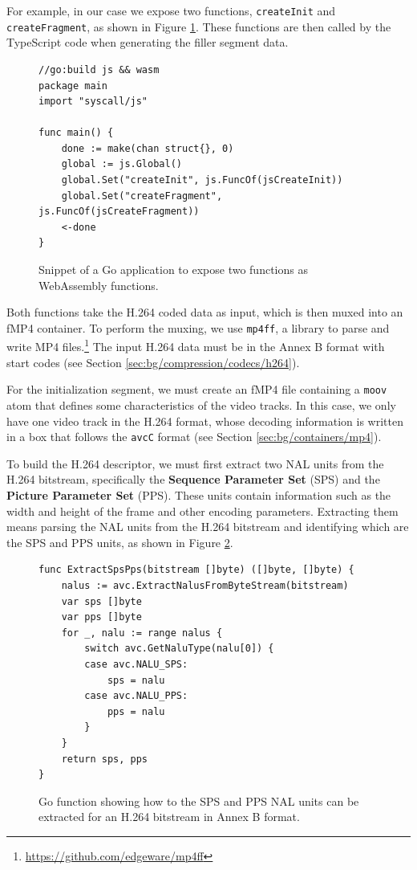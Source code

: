 For example, in our case we expose two functions, \texttt{createInit} and \texttt{createFragment}, as shown in Figure \ref{fig:wasm_go_main}. These functions are then called by the TypeScript code when generating the filler segment data.

\begin{figure}[h]
    \centering
    \begin{verbatim}
//go:build js && wasm
package main
import "syscall/js"

func main() {
	done := make(chan struct{}, 0)
	global := js.Global()
	global.Set("createInit", js.FuncOf(jsCreateInit))
	global.Set("createFragment", js.FuncOf(jsCreateFragment))
	<-done
}
    \end{verbatim}
    \caption{Snippet of a Go application to expose two functions as WebAssembly functions.}
    \label{fig:wasm_go_main}
\end{figure}

Both functions take the H.264 coded data as input, which is then muxed into an fMP4 container. To perform the muxing, we use \texttt{mp4ff}, a library to parse and write MP4 files.\footnote{\url{https://github.com/edgeware/mp4ff}} The input H.264 data must be in the Annex B format with start codes (see Section \ref{sec:bg/compression/codecs/h264}).

For the initialization segment, we must create an fMP4 file containing a \texttt{moov} atom that defines some characteristics of the video tracks. In this case, we only have one video track in the H.264 format, whose decoding information is written in a box that follows the \texttt{avcC} format (see Section \ref{sec:bg/containers/mp4}).

To build the H.264 descriptor, we must first extract two NAL units from the H.264 bitstream, specifically the \textbf{Sequence Parameter Set} (SPS) and the \textbf{Picture Parameter Set} (PPS). These units contain information such as the width and height of the frame and other encoding parameters. Extracting them means parsing the NAL units from the H.264 bitstream and identifying which are the SPS and PPS units, as shown in Figure \ref{fig:wasm_go_sps}.

\begin{figure}[h]
    \centering
    \begin{verbatim}
func ExtractSpsPps(bitstream []byte) ([]byte, []byte) {
	nalus := avc.ExtractNalusFromByteStream(bitstream)
	var sps []byte
	var pps []byte
	for _, nalu := range nalus {
		switch avc.GetNaluType(nalu[0]) {
		case avc.NALU_SPS:
			sps = nalu
		case avc.NALU_PPS:
			pps = nalu
		}
	}
	return sps, pps
}
    \end{verbatim}
    \caption{Go function showing how to the SPS and PPS NAL units can be extracted for an H.264 bitstream in Annex B format.}
    \label{fig:wasm_go_sps}
\end{figure}

